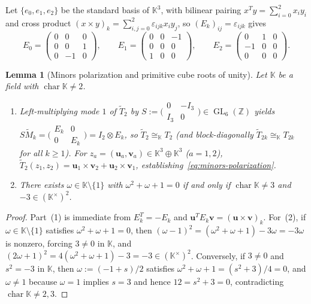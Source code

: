 \documentclass[11pt,reqno]{amsart}
\newtheorem{lemma}[theorem]{Lemma}
\theoremstyle{definition}
\theoremstyle{remark}
\numberwithin{equation}{section}
\newcommand{\KK}{\mathbb{K}}
\newcommand{\ZZ}{\mathbb{Z}}
\DeclareMathOperator{\GL}{GL}
\DeclareMathOperator{\chr}{char}
\begin{document}
Let $\{e_0, e_1, e_2\}$ be the standard basis of $\KK^3$, with bilinear pairing $x^T y = \sum_{i=0}^2 x_i y_i$ and cross product $(x \times y)_k = \sum_{i,j=0}^2 \varepsilon_{ijk} x_i y_j$, so $(E_k)_{ij} = \varepsilon_{ijk}$ gives
\[
  E_0 = \begin{pmatrix} 0 & 0 & 0 \\ 0 & 0 & 1 \\ 0 & -1 & 0 \end{pmatrix}, \qquad
  E_1 = \begin{pmatrix} 0 & 0 & -1 \\ 0 & 0 & 0 \\ 1 & 0 & 0 \end{pmatrix}, \qquad
  E_2 = \begin{pmatrix} 0 & 1 & 0 \\ -1 & 0 & 0 \\ 0 & 0 & 0 \end{pmatrix}.
\]

\begin{lemma}[Minors polarization and primitive cube roots of unity]\label{lem:minors-and-omega}
Let $\KK$ be a field with $\chr\KK \neq 2$.
\begin{enumerate}[label=\textup{(\arabic*)},leftmargin=2em]
  \item Left-multiplying mode $1$ of $\widetilde{T}_2$ by $S := \bigl(\begin{smallmatrix} 0 & -I_3 \\ I_3 & 0 \end{smallmatrix}\bigr) \in \GL_6(\ZZ)$ yields $S \widetilde{M}_k = \bigl(\begin{smallmatrix} E_k & 0 \\ 0 & E_k \end{smallmatrix}\bigr) = I_2 \otimes E_k$, so $\widetilde{T}_2 \cong_{\KK} T_2$ (and block-diagonally $\widetilde{T}_{2k} \cong_{\KK} T_{2k}$ for all $k \ge 1$). For $z_a = (\mathbf{u}_a, \mathbf{v}_a) \in \KK^3 \oplus \KK^3$ ($a = 1, 2$), $\widetilde{T}_2(z_1, z_2) = \mathbf{u}_1 \times \mathbf{v}_2 + \mathbf{u}_2 \times \mathbf{v}_1$, establishing~\eqref{eq:minors-polarization}.
  \item There exists $\omega \in \KK\setminus\{1\}$ with $\omega^2 + \omega + 1 = 0$ if and only if $\chr\KK \neq 3$ and $-3 \in (\KK^\times)^2$.
\end{enumerate}
\end{lemma}

\begin{proof}
Part~(1) is immediate from $E_k^T = -E_k$ and $\mathbf{u}^T E_k \mathbf{v} = (\mathbf{u} \times \mathbf{v})_k$. For~(2), if $\omega \in \KK\setminus\{1\}$ satisfies $\omega^2 + \omega + 1 = 0$, then $(\omega - 1)^2 = (\omega^2 + \omega + 1) - 3\omega = -3\omega$ is nonzero, forcing $3 \neq 0$ in $\KK$, and $(2\omega + 1)^2 = 4(\omega^2 + \omega + 1) - 3 = -3 \in (\KK^\times)^2$. Conversely, if $3 \neq 0$ and $s^2 = -3$ in $\KK$, then $\omega := (-1 + s)/2$ satisfies $\omega^2 + \omega + 1 = (s^2 + 3)/4 = 0$, and $\omega \neq 1$ because $\omega = 1$ implies $s = 3$ and hence $12 = s^2 + 3 = 0$, contradicting $\chr\KK \neq 2, 3$.
\end{proof}
\end{document}

